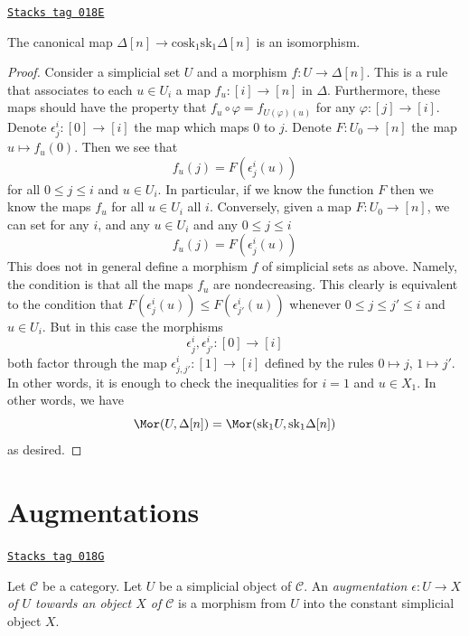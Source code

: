 \begin{lemma}
\label{simplicial-lemma-simplex-cosk}
\href{https://stacks.math.columbia.edu/tag/018E}{\texttt{Stacks tag 018E}}

The canonical map
$\Delta[n] \to \text{cosk}_1 \text{sk}_1 \Delta[n]$
is an isomorphism.
\end{lemma}

\begin{proof}
Consider a simplicial set $U$ and a morphism
$f : U \to \Delta[n]$. This is a rule that associates
to each $u \in U_i$ a map $f_u : [i] \to [n]$ in $\Delta$.
Furthermore, these maps should have the property that
$f_u \circ \varphi = f_{U(\varphi)(u)}$ for any
$\varphi : [j] \to [i]$. Denote $\epsilon^i_j : [0] \to [i]$
the map which maps $0$ to $j$. Denote $F : U_0 \to [n]$
the map $u \mapsto f_u(0)$. Then we see that
$$
f_u(j) = F(\epsilon^i_j(u))
$$
for all $0 \leq j \leq i$ and $u \in U_i$.
In particular, if we know the function $F$
then we know the maps $f_u$ for all $u\in U_i$ all $i$.
Conversely, given a map $F : U_0 \to [n]$,
we can set for any $i$, and any $u \in U_i$
and any $0 \leq j \leq i$
$$
f_u(j) = F(\epsilon^i_j(u))
$$
This does not in general define a morphism $f$ of simplicial sets
as above. Namely, the condition is that all the maps $f_u$ are
nondecreasing. This clearly is equivalent to the condition
that $F(\epsilon^i_j(u)) \leq F(\epsilon^i_{j'}(u))$
whenever $0 \leq j \leq j' \leq i$ and $u \in U_i$. But in this
case the morphisms
$$
\epsilon^i_j, \epsilon^i_{j'} : [0] \to [i]
$$
both factor through the map
$\epsilon^i_{j, j'} : [1] \to [i]$ defined by the rules
$0 \mapsto j$, $1 \mapsto j'$.
In other words, it is enough to check the inequalities for
$i = 1$ and $u \in X_1$. In other words, we have
$$
\Mor(U, \Delta[n])
=
\Mor(\text{sk}_1 U, \text{sk}_1 \Delta[n])
$$
as desired.
\end{proof}

\section{Augmentations}
\label{simplicial-section-augmentation}
\begin{definition}[Augmentation]
\label{simplicial-definition-augmentation}
\href{https://stacks.math.columbia.edu/tag/018G}{\texttt{Stacks tag 018G}}

Let $\mathcal{C}$ be a category.
Let $U$ be a simplicial object of $\mathcal{C}$.
An {\it augmentation $\epsilon : U \to X$ of
$U$ towards an object $X$ of $\mathcal{C}$}
is a morphism from $U$ into the constant simplicial
object $X$.
\end{definition}

